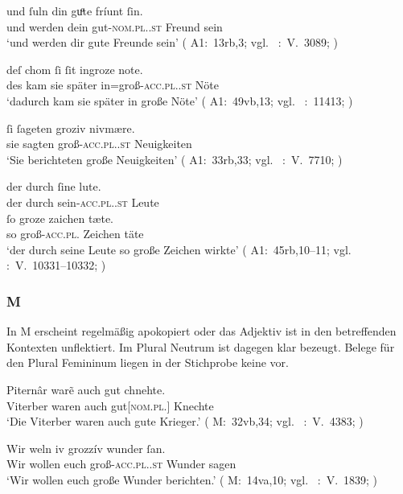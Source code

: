 \begin{exe}
\ex \label{ex:kca1regel}
	\begin{xlist}
	\ex \label{ex:kca1regel_1}
		\gll und ſuln din guͦte fríunt ſin. \\
			und werden dein gut-\textsc{nom.pl.\MascA.st} Freund sein \\
		\trans `und werden dir gute Freunde sein'
			(%
				A1:~13rb,3; vgl.~%
				\KC:~V.~3089;
				\cite[137]{schroeder1895}%
			)

	\ex \label{ex:kca1regel_2}
		\gll deſ chom ſi ſit ingroze note. \\
			des kam sie später in=groß-\textsc{acc.pl.\FemI.st} Nöte \\
		\trans `dadurch kam sie später in große Nöte'
			(%
				A1:~49vb,13; vgl.~%
				\KC:~11413;
				\cites[290]{schroeder1895}%
			)

	\ex \label{ex:kca1regel_3}
		\gll ſi ſageten groziv nivmære. \\
			sie sagten groß-\textsc{acc.pl.\NeutI.st} Neuigkeiten \\
		\trans `Sie berichteten große Neuigkeiten'
			(%
				A1:~33rb,33; vgl.~%
				\KC:~V.~7710;
				\cites[222]{schroeder1895}%
			)
	\end{xlist}

\ex\label{ex:kca1akkplne}
	\gll der durch ſine lute. \\
		der durch sein-\textsc{acc.pl.\MascA.st} Leute \\
\sn \gll ſo groze zaichen tæte. \\
		so groß-\textsc{acc.pl.\NeutI} Zeichen täte \\
	\trans `der durch seine Leute so große Zeichen wirkte'
		(%
			A1:~45rb,10--11; vgl.~%
			\KC:~V.~10331--10332;
			\cite[271]{schroeder1895}%
		)
\end{exe}

\subsubsection{M}
In M erscheint  regelmäßig apokopiert oder das Adjektiv ist
in den betreffenden Kontexten unflektiert. Im Plural Neutrum ist dagegen klar
 bezeugt. Belege für den Plural Femininum liegen in der Stichprobe
keine vor.

\begin{exe}
\ex \label{ex:kcmpl}
	\begin{xlist}
	\ex \label{ex:kcmpl_1}
		\gll Piternâr warẽ auch gut chnehte. \\
			Viterber waren auch gut[\textsc{nom.pl.\MascM}] Knechte \\
		\trans `Die Viterber waren auch gute Krieger.'
			(%
				M:~32vb,34; vgl.~%
				\KC:~V.~4383;
				\cite[161]{schroeder1895}%
			)

	\ex \label{ex:kcmpl_2}
		\gll Wir weln iv grozzív wunder ſan. \\
			Wir wollen euch groß-\textsc{acc.pl.\NeutI.st} Wunder sagen \\
		\trans `Wir wollen euch große Wunder berichten.'
			(%
				M:~14va,10; vgl.~%
				\KC:~V.~1839;
				\cite[115]{schroeder1895}%
			)
	\end{xlist}
\end{exe}

